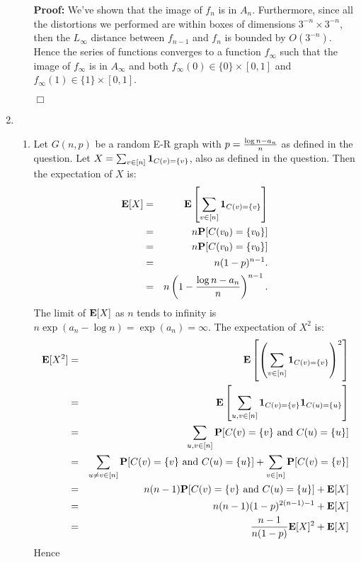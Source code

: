 \documentclass[11pt]{article} \usepackage{amssymb}
\newenvironment{proof}{\noindent \textbf{Proof:}}{$\Box$}
\newcommand{\E}{{\bf E}} \newcommand{\Cov}{{\bf Cov}}
\begin{document}
\begin{enumerate}
\begin{enumerate}
\begin{proof}
        We've shown that the image of $f_n$ is in $A_n$. Furthermore, 
        since all the distortions we performed are within boxes of dimensions
        $3^{-n}\times 3^{-n}$, then the $L_\infty$ distance between $f_{n-1}$ and
        $f_n$ is bounded by $O(3^{-n})$. Hence the series of functions
        converges to a function $f_\infty$ such that the image of $f_\infty$ is in
        $A_\infty$ and both $f_\infty(0)\in\{0\}\times [0,1]$ and 
        $f_\infty(1)\in\{1\}\times [0,1]$.
        
      \end{proof}
    \end{enumerate}
  \item
    \begin{enumerate}
    \item 
      Let $G(n,p)$ be a random E-R graph with $p={\log n-a_n\over n}$ as defined
      in the question. Let $X=\sum_{v\in[n]}{\bf 1}_{C(v)=\{v\}}$, also as defined
      in the question. Then the expectation of $X$ is:
      \begin{eqnarray*}
        \E[X] &=& \E\left[\sum_{v\in[n]}{\bf 1}_{C(v)=\{v\}}\right]
        \\ &=& n\P[C(v_0)=\{v_0\}]
        \\ &=& n\P[C(v_0)=\{v_0\}]
        \\ &=& n(1-p)^{n-1}.
        \\ &=& n\left(1-{\log n-a_n\over n}\right)^{n-1}.
      \end{eqnarray*}
      The limit of $\E[X]$ as $n$ tends to infinity is 
      $n\exp(a_n-\log n)=\exp(a_n)=\infty$.
      The expectation of $X^2$ is:
      \begin{eqnarray*}
        \E[X^2] &=& \E\left[\left(\sum_{v\in[n]}{\bf 1}_{C(v)=\{v\}}\right)^2\right]
        \\ &=& \E\left[\sum_{u,v\in[n]}{\bf 1}_{C(v)=\{v\}}{\bf 1}_{C(u)=\{u\}}\right]
        \\ &=& \sum_{u,v\in[n]}\P[C(v)=\{v\} \mbox{ and } C(u)=\{u\}]
        \\ &=& \sum_{u\neq v\in[n]}\P[C(v)=\{v\} \mbox{ and } C(u)=\{u\}]+\sum_{v\in[n]}\P[C(v)=\{v\}]
        \\ &=& n(n-1)\P[C(v)=\{v\} \mbox{ and } C(u)=\{u\}]+\E[X]
        \\ &=& n(n-1)(1-p)^{2(n-1)-1}+\E[X]
        \\ &=& {n-1\over n(1-p)}\E[X]^2+\E[X]
      \end{eqnarray*}
      Hence
      \begin{eqnarray*}

\end{eqnarray*}
\end{enumerate}
\end{enumerate}
\end{document}
